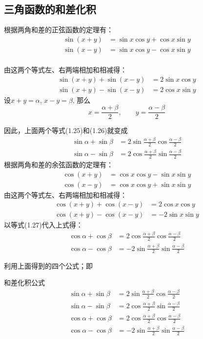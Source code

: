 \subsection{三角函数的和差化积}

根据两角和差的正弦函数的定理有：
\[\begin{split}
    \sin(x+y)&=\sin x\cos y+\cos x\sin y\\
    \sin(x-y)&=\sin x\cos y-\cos x\sin y\\
\end{split}\]

由这两个等式左、右两端相加和相减得：
\begin{align}
 \sin (x+y) +\sin (x-y) &=2\sin x\cos y\\
\sin (x+y)-\sin (x-y) &=2\cos x\sin y   
\end{align}
设$x+y=\alpha$, $x-y=\beta$, 那么
\begin{equation}
    x=\frac{\alpha+\beta}{2},\qquad y=\frac{\alpha-\beta}{2}
\end{equation}

因此，上面两个等式(1.25)和(1.26)就变成
\begin{align*}
\sin\alpha+\sin\beta&=2\sin\frac{\alpha+\beta}{2}\cos\frac{\alpha-\beta}{2}\tag{I}\\
\sin\alpha-\sin\beta&=2\cos\frac{\alpha+\beta}{2}\sin\frac{\alpha-\beta}{2}\tag{II}
\end{align*}
根据两角和差的余弦函数的定理有：
\[\begin{split}
    \cos (x+y) &=\cos x\cos y - \sin x\sin y\\
\cos (x-y) &=\cos x\cos y +\sin x \sin y
\end{split}\]
由这两个等式左、右两端相加和相减得：
\begin{align}
    \cos (x+y) +\cos(x-y)&=2\cos x\cos y\\
\cos (x+y) -\cos (x-y) &=-2\sin x\sin y
\end{align}
以等式(1.27)代入上式得：
\begin{align*}
\cos\alpha+\cos\beta&=2\cos\frac{\alpha+\beta}{2}\cos\frac{\alpha-\beta}{2}\tag{III}\\
\cos\alpha-\cos\beta&=-2\sin\frac{\alpha+\beta}{2}\sin\frac{\alpha-\beta}{2}\tag{IV}
\end{align*}

利用上面得到的四个公式；即
\begin{blk}{和差化积公式}
\begin{align*}
    \sin\alpha+\sin\beta&=2\sin\frac{\alpha+\beta}{2}\cos\frac{\alpha-\beta}{2}\tag{I}\\
\sin\alpha-\sin\beta&=2\cos\frac{\alpha+\beta}{2}\sin\frac{\alpha-\beta}{2}\tag{II}\\
\cos\alpha+\cos\beta&=2\cos\frac{\alpha+\beta}{2}\cos\frac{\alpha-\beta}{2}\tag{III}\\
\cos\alpha-\cos\beta&=-2\sin\frac{\alpha+\beta}{2}\sin\frac{\alpha-\beta}{2}\tag{IV}
\end{align*}
\end{blk}

